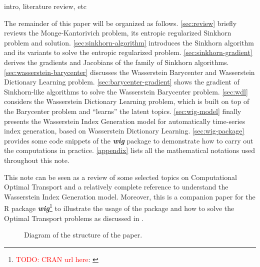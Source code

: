 

intro, literature review, etc

The remainder of this paper will be organized as follows.
\cref{sec:review} briefly reviews the Monge-Kantorivich problem, its entropic regularized Sinkhorn problem and solution.
\cref{sec:sinkhorn-algorithm} introduces the Sinkhorn algorithm and its variants to solve the entropic regularized problem.
\cref{sec:sinkhorn-gradient} derives the gradients and Jacobians of the family of Sinkhorn algorithms.
\cref{sec:wasserstein-barycenter} discusses the Wasserstein Barycenter and Wasserstein Dictionary Learning
problem.
\cref{sec:barycenter-gradient} shows the gradient of Sinkhorn-like algorithms to solve the Wasserstein Barycenter problem.
\cref{sec:wdl} considers the Wasserstein Dictionary Learning problem,
which is built on top of the Barycenter problem and ``learns'' the latent topics.
\cref{sec:wig-model} finally presents the Wasserstein Index Generation model for automatically time-series index generation,
based on Wasserstein Dictionary Learning.
\cref{sec:wig-package} provides some code snippets of the \textbf{\textit{wig}} package to demonstrate how to carry out the
computations in practice.
\cref{appendix} lists all the mathematical notations used throughout this note.

This note can be seen as a review of some selected topics on Computational Optimal Transport
and a relatively complete reference to understand the Wasserstein Index Generation model.
Moreover, this is a companion paper for the R package \textbf{\textit{wig}}\footnote{
  \textcolor{red}{TODO: CRAN url here}: \url{}
} to illustrate the usage of the package and how to solve the Optimal Transport problems as discussed in
.


\begin{figure}%
  \centering
  \caption{Diagram of the structure of the paper.}\label{fig:article-diagram}
\end{figure}


